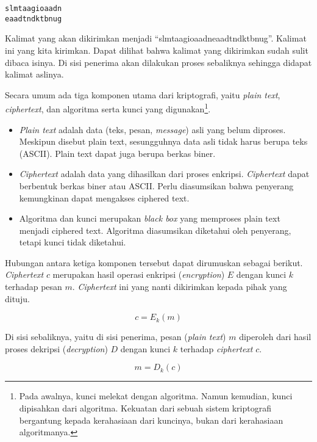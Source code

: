 \begin{mdframed}
\begin{verbatim}
slmtaagioaadn
eaadtndktbnug
\end{verbatim}
\end{mdframed}

Kalimat yang akan dikirimkan menjadi ``slmtaagioaadneaadtndktbnug''. Kalimat
ini yang kita kirimkan. Dapat dilihat bahwa kalimat yang dikirimkan sudah sulit
dibaca isinya. Di sisi penerima akan dilakukan proses sebaliknya sehingga
didapat kalimat aslinya.


Secara umum ada tiga komponen utama dari kriptografi, yaitu {\em plain text},
{\em ciphertext}, dan algoritma serta kunci yang digunakan\footnote{Pada
awalnya, kunci melekat dengan algoritma. Namun kemudian, kunci dipisahkan dari
algoritma. Kekuatan dari sebuah sistem kriptografi bergantung kepada
kerahasiaan dari kuncinya, bukan dari kerahasiaan algoritmanya.}.
\begin{itemize}
  \item {\em Plain text} adalah data (teks, pesan, {\em message}) asli yang
  belum diproses. Meskipun disebut plain text, sesungguhnya data asli tidak
  harus berupa teks (ASCII). Plain text dapat juga berupa berkas biner.
  \item {\em Ciphertext} adalah data yang dihasilkan dari proses enkripsi.
     {\em Ciphertext} dapat berbentuk berkas biner atau ASCII. Perlu diasumsikan
  bahwa penyerang kemungkinan dapat mengakses ciphered text.
  \item Algoritma dan kunci merupakan {\em black box} yang memproses plain text
  menjadi ciphered text. Algoritma diasumsikan diketahui oleh penyerang,
  tetapi kunci tidak diketahui.
\end{itemize}

Hubungan antara ketiga komponen tersebut dapat dirumuskan sebagai berikut.
{\em Ciphertext} $c$ merupakan hasil operasi enkripsi ({\em encryption}) $E$ 
dengan kunci $k$ terhadap pesan $m$. {\em Ciphertext} ini yang nanti dikirimkan
kepada pihak yang dituju.

\begin{equation}
   c = E_k(m)
\end{equation}

Di sisi sebaliknya, yaitu di sisi penerima, pesan ({\em plain text}) $m$
diperoleh dari hasil proses dekripsi ({\em decryption}) $D$ dengan kunci $k$
terhadap {\em ciphertext} $c$.

\begin{equation}
   m = D_k(c)
\end{equation}

